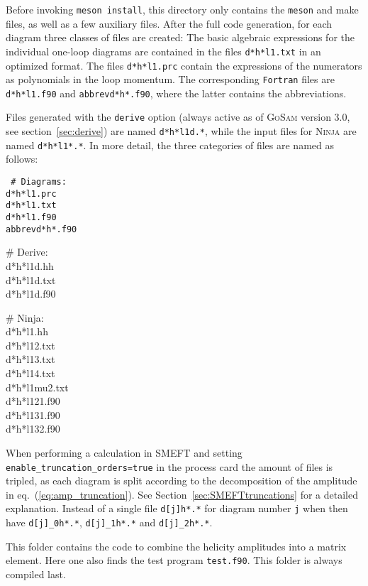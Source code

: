 \documentclass[11pt,a4paper]{refrep}
\newcommand{\gosam}{\textsc{GoSam}\xspace}
\newcommand{\ninja}{\textsc{Ninja}\xspace}
\begin{document}
Before invoking \texttt{meson install}, 
this directory only contains the \texttt{meson} and make files, as well as a few auxiliary files. After the full code
generation, for each diagram three classes of files are created: The
basic algebraic expressions for the individual one-loop diagrams are
contained in the files {\tt d*h*l1.txt} in an optimized format. The
files {\tt d*h*l1.prc} contain the expressions of the numerators as 
polynomials in the loop momentum. The corresponding {\tt Fortran} files
are {\tt d*h*l1.f90} and {\tt abbrevd*h*.f90}, where the latter
contains the abbreviations. 

Files generated with the {\tt derive} option (always active as of \gosam version 3.0, see section~\ref{sec:derive}) are
named {\tt d*h*l1d.*}, while the input files
for \ninja{}  are named {\tt d*h*l1*.*}. 
In more detail, the three categories of files are named as follows:\\
{\tt
\# Diagrams:\\
 d*h*l1.prc\\
 d*h*l1.txt\\
 d*h*l1.f90\\
 abbrevd*h*.f90

\# Derive:\\
 d*h*l1d.hh\\
 d*h*l1d.txt\\
 d*h*l1d.f90

\# Ninja:\\
 d*h*l1.hh\\
 d*h*l12.txt\\
 d*h*l13.txt\\
 d*h*l14.txt\\
 d*h*l1mu2.txt\\
 d*h*l121.f90\\
 d*h*l131.f90\\
 d*h*l132.f90
}

When performing a calculation in SMEFT and setting\\ \texttt{enable\_truncation\_orders=true} in the process card the amount of files is tripled, as each diagram is split according to the decomposition of the amplitude in eq.~(\ref{eq:amp_truncation}). See Section~\ref{sec:SMEFTtruncations} for a detailed explanation. Instead of a single file \texttt{d[j]h*.*} for diagram number \texttt{j} when then have \texttt{d[j]\_0h*.*}, \texttt{d[j]\_1h*.*} and \texttt{d[j]\_2h*.*}.

 This folder contains the code to combine
the helicity amplitudes into a matrix element. Here one also finds
the test program \texttt{test.f90}. This folder is always compiled last.
\end{document}
